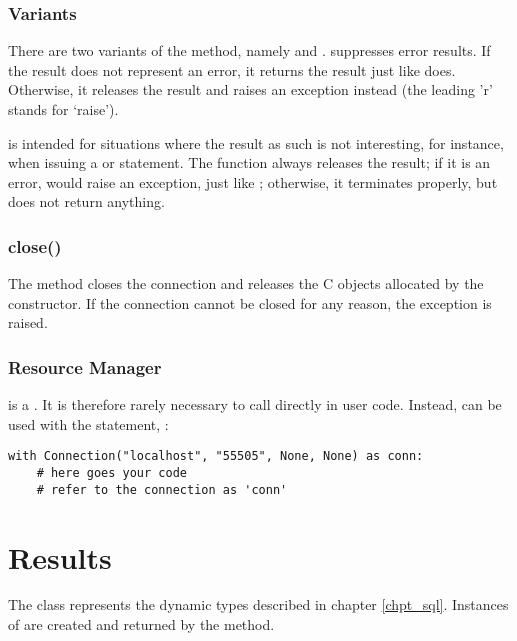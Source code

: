 \subsubsection{Variants}
There are two variants of the  method,
namely  and .
 suppresses error results.
If the result does not represent an error,
it returns the result just like  does.
Otherwise, it releases the result and raises
an exception instead (the leading 'r' stands
for `raise').

 is intended for situations
where the result as such is not interesting,
for instance, when issuing a  or
 statement.
The function always releases the result;
if it is an error,
 would raise an exception,
just like ;
otherwise, it terminates properly,
but does not return anything.

\subsubsection{close()}
The method closes the connection and
releases the C objects allocated by
the constructor. If the connection
cannot be closed for any reason,
the exception  is raised.

\subsubsection{Resource Manager}
 is a .
It is therefore rarely necessary to call
 directly in user code.
Instead,  can
be used with the  statement, \ie:

\begin{python}
\begin{lstlisting}
with Connection("localhost", "55505", None, None) as conn:
    # here goes your code
    # refer to the connection as 'conn'
\end{lstlisting}
\end{python}

\section{Results}
The  class represents
the dynamic types described in chapter \ref{chpt_sql}.
Instances of  are
created and returned by
the  method.

